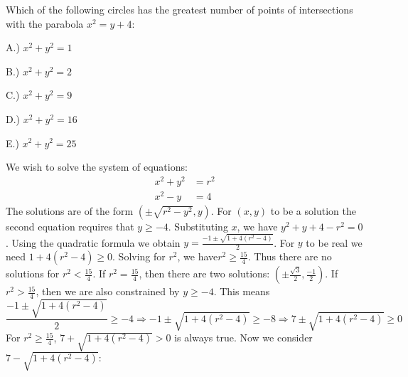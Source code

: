 \documentclass[crop=false,class=book,oneside]{standalone}
\begin{document}
            \begin{lexample}
                Which of the following circles has
                the greatest number of
                points of intersections with the parabola $x^{2}=y+4$:
                \begin{enumerate}
                    \begin{multicols}{5}
                        \item[A.)] $x^{2}+y^{2}=1$
                        \item[B.)] $x^{2}+y^{2}=2$
                        \item[C.)] $x^{2}+y^{2}=9$
                        \item[D.)] $x^{2}+y^{2}=16$
                        \item[E.)] $x^{2}+y^{2}=25$
                    \end{multicols}
                \end{enumerate}
                We wish to solve the system of equations:
                \begin{align*}
                    x^{2}+y^{2}&=r^{2}\\
                    x^{2}-y&=4
                \end{align*}
                The solutions are of the form $(\pm \sqrt{r^2-y^2},y)$.
                For $(x,y)$ to be a solution
                the second equation requires
                that $y\geq -4$. Substituting $x$, we have
                $y^{2}+y+4-r^{2}=0$. Using the quadratic formula
                we obtain
                $y=\frac{-1\pm\sqrt{1+4(r^{2}-4)}}{2}$.
                For $y$ to be real
                we need $1+4(r^{2}-4)\geq 0$. Solving for $r^2$,
                we have$r^{2}\geq\frac{15}{4}$.
                Thus there are no solutions for
                $r^{2}<\frac{15}{4}$. If $r^{2}=\frac{15}{4}$,
                then there are two solutions:
                $(\pm\frac{\sqrt{3}}{2},\frac{-1}{2})$. If
                $r^{2}>\frac{15}{4}$, then we are
                also constrained by $y\geq-4$. This means 
                \begin{equation*}
                    \frac{-1\pm\sqrt{1+4(r^{2}-4)}}{2}\geq-4
                    \Rightarrow -1\pm\sqrt{1+4(r^{2}-4)}\geq-8
                    \Rightarrow 7\pm\sqrt{1+4(r^{2}-4)}\geq 0
                \end{equation*}
                For $r^2 \geq \frac{15}{4}$, $7+\sqrt{1+4(r^2-4)}>0$
                is always true. Now we consider $7-\sqrt{1+4(r^2-4)}:$

\end{lexample}
\end{document}
